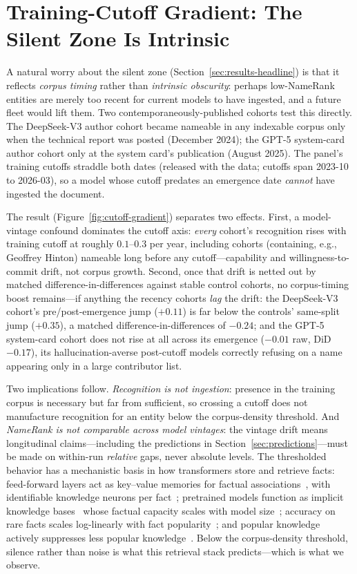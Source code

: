 \section{Training-Cutoff Gradient: The Silent Zone Is Intrinsic}
\label{app:cutoff}

A natural worry about the silent zone (Section~\ref{sec:results-headline}) is that it reflects \emph{corpus timing} rather than \emph{intrinsic obscurity}: perhaps low-NameRank entities are merely too recent for current models to have ingested, and a future fleet would lift them. Two contemporaneously-published cohorts test this directly. The DeepSeek-V3 author cohort became nameable in any indexable corpus only when the technical report was posted (December 2024); the GPT-5 system-card author cohort only at the system card's publication (August 2025). The panel's training cutoffs straddle both dates (released with the data; cutoffs span 2023-10 to 2026-03), so a model whose cutoff predates an emergence date \emph{cannot} have ingested the document.

The result (Figure~\ref{fig:cutoff-gradient}) separates two effects. First, a model-vintage confound dominates the cutoff axis: \emph{every} cohort's recognition rises with training cutoff at roughly $0.1$--$0.3$ per year, including cohorts (containing, e.g., Geoffrey Hinton) nameable long before any cutoff---capability and willingness-to-commit drift, not corpus growth. Second, once that drift is netted out by matched difference-in-differences against stable control cohorts, no corpus-timing boost remains---if anything the recency cohorts \emph{lag} the drift: the DeepSeek-V3 cohort's pre/post-emergence jump ($+0.11$) is far below the controls' same-split jump ($+0.35$), a matched difference-in-differences of $-0.24$; and the GPT-5 system-card cohort does not rise at all across its emergence ($-0.01$ raw, DiD $-0.17$), its hallucination-averse post-cutoff models correctly refusing on a name appearing only in a large contributor list.

Two implications follow. \emph{Recognition is not ingestion}: presence in the training corpus is necessary but far from sufficient, so crossing a cutoff does not manufacture recognition for an entity below the corpus-density threshold. And \emph{NameRank is not comparable across model vintages}: the vintage drift means longitudinal claims---including the predictions in Section~\ref{sec:predictions}---must be made on within-run \emph{relative} gaps, never absolute levels. The thresholded behavior has a mechanistic basis in how transformers store and retrieve facts: feed-forward layers act as key--value memories for factual associations~\citep{geva2021transformer}, with identifiable knowledge neurons per fact~\citep{dai2022knowledge, meng2022locating}; pretrained models function as implicit knowledge bases~\citep{petroni2019language} whose factual capacity scales with model size~\citep{roberts2020much}; accuracy on rare facts scales log-linearly with fact popularity~\citep{kandpal2023, mallen2023trust}; and popular knowledge actively suppresses less popular knowledge~\citep{overshadow2025}. Below the corpus-density threshold, silence rather than noise is what this retrieval stack predicts---which is what we observe.

